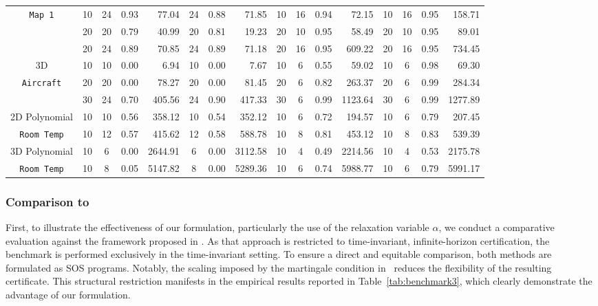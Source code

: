 \documentclass[journal,twoside,web]{ieeecolor}
\newcommand{\ml}[1]{{\color{blue}[ML: #1]}}
\theoremstyle{definition}
\theoremstyle{plain}
\theoremstyle{plain}
\begin{document}
\begin{table}[t]
{\begin{tabular}{c | cccr | ccr | cccr | cccr}
     \texttt{Map 1} &  10 & 24 &  0.93 &  77.04  & 24 & 0.88 & 71.85 & 10 & 16 & 0.94 & 72.15 & 10 &  16 & 0.95 & 158.71\\
    &  20 & 20 & 0.79  & 40.99   & 20 & 0.81 & 19.23  & 20 & 10 & 0.95 & 58.49 & 20 & 10 & 0.95 & 89.01 \\
    &  20 & 24 &  0.89 &  70.85  & 24 & 0.89  & 71.18 & 20 & 16 & 0.95 &609.22 & 20 & 16 & 0.95 & 734.45 \\
    \midrule
      {3D}      &  10 &  10 & 0.00 & 6.94 & 10 & 0.00 & 7.67 & 10 & 6 & 0.55 & 59.02 & 10 & 6 & 0.98 & 69.30 \\  
      \texttt{Aircraft}  &  20 &  20 & 0.00 & 78.27 & 20 & 0.00 & 81.45 & 20 & 6 & 0.82 & 263.37 & 20 & 6 & 0.99 & 284.34 \\  
           & 30 & 24 & 0.70 & 405.56  & 24 & 0.90 & 417.33 & 30 & 6 & 0.99 & 1123.64 & 30 & 6 & 0.99 & 1277.89 \\
           \midrule
      {2D Polynomial}      & 10 & 10 & 0.56 & 358.12 & 10 & 0.54 & 352.12 & 10 & 6 & 0.72 & 194.57 & 10 & 6 & 0.79 & 207.45   \\
      \texttt{Room Temp} & 10 & 12 & 0.57 & 415.62 & 12 & 0.58 & 588.78 & 10& 8 & 0.81 & 453.12 & 10 & 8 & 0.83 & 539.39  \\
       \midrule
      {3D Polynomial}  & 10 & 6 & 0.00 & 2644.91 & 6 & 0.00 & 3112.58 & 10 & 4 & 0.49 & 2214.56 & 10 & 4 & 0.53 & 2175.78 \\
      \texttt{Room Temp} & 10 & 8 & 0.05 & 5147.82 & 8 & 0.00 & 5289.36 & 10 & 6 & 0.74 & 5988.77 & 10 & 6 & 0.79 & 5991.17\\
      \bottomrule
\end{tabular}
}
\end{table}



\subsubsection{Comparison to \cite{vzikelic2023learning}}
{First, to illustrate the effectiveness of our formulation, particularly the use of the relaxation variable $\alpha$, we conduct a comparative evaluation against the framework proposed in \cite{vzikelic2023learning}}.
As that approach is restricted to time-invariant, infinite-horizon certification, the benchmark is performed exclusively in the time-invariant setting. To ensure a direct and equitable comparison, both methods are formulated as SOS programs. Notably, the scaling imposed by the martingale condition in~\cite{vzikelic2023learning} reduces the flexibility of the resulting certificate. This structural restriction manifests in the empirical results reported in Table~\ref{tab:benchmark3}, which clearly demonstrate the advantage of our formulation.
\end{document}
